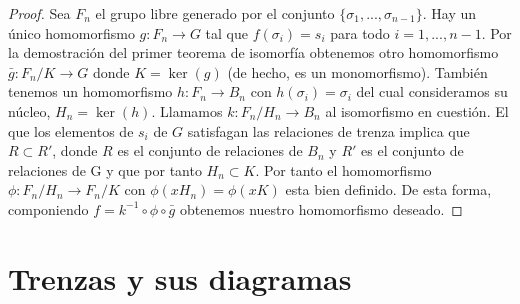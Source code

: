 \documentclass[12pt]{book}
\theoremstyle{definition}
\begin{document}
\begin{proof} Sea $F_n$ el grupo libre generado por el conjunto $\{\sigma_1,...,\sigma_{n-1}\}$. Hay un único homomorfismo $g:F_n\rightarrow G$ tal que $f(\sigma_i)= s_i$ para todo $i=1,...,n-1$. Por la demostración del primer teorema de isomorfía obtenemos otro homomorfismo $\bar{g}:F_n/K\rightarrow G$ donde $K=\ker(g)$ (de hecho, es un monomorfismo). También tenemos un homomorfismo $h:F_n\rightarrow B_n$ con $h(\sigma_i)=\sigma_i$ del cual consideramos su núcleo, $H_n=\ker(h)$. Llamamos $k:F_n/H_n\rightarrow B_n$ al isomorfismo en cuestión. El que los elementos de $s_i$ de $G$ satisfagan las relaciones de trenza implica que $R\subset R'$, donde $R$ es el conjunto de relaciones de $B_n$ y $R'$ es el conjunto de relaciones de G y que por tanto $H_n\subset K$. Por tanto el homomorfismo $\phi:F_n/H_n\rightarrow F_n/K$ con $\phi(xH_n)=\phi(xK)$ esta bien definido. De esta forma, componiendo $f=k^{-1}\circ \phi \circ \bar{g}$ obtenemos nuestro homomorfismo deseado.
\end{proof}



\section{Trenzas y sus diagramas}
\end{document}
